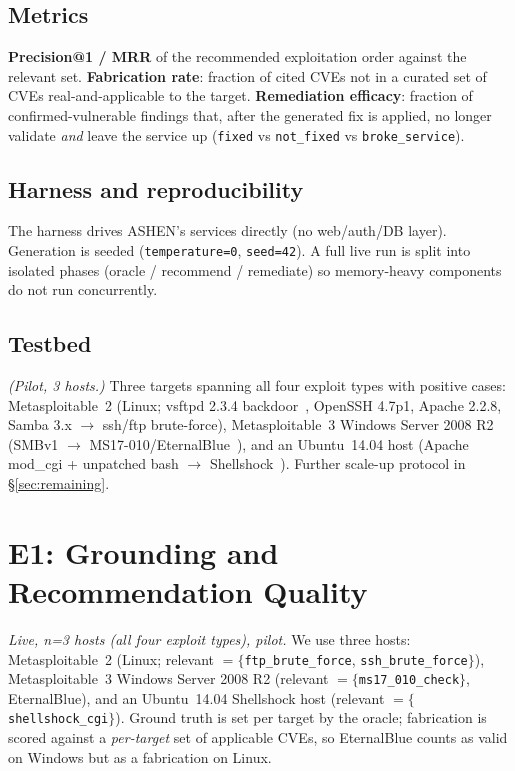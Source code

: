 \documentclass[conference]{IEEEtran}
\newcommand{\code}[1]{\texttt{#1}}
\begin{document}
\subsection{Metrics}
\textbf{Precision@1 / MRR} of the recommended exploitation order against the
relevant set. \textbf{Fabrication rate}: fraction of cited CVEs not in a curated
set of CVEs real-and-applicable to the target. \textbf{Remediation efficacy}:
fraction of confirmed-vulnerable findings that, after the generated fix is
applied, no longer validate \emph{and} leave the service up (\code{fixed} vs
\code{not\_fixed} vs \code{broke\_service}).

\subsection{Harness and reproducibility}
The harness drives ASHEN's services directly (no web/auth/DB layer). Generation
is seeded (\code{temperature=0}, \code{seed=42}). A full live run is split into
isolated phases (oracle / recommend / remediate) so memory-heavy components do not
run concurrently.

\subsection{Testbed}
\emph{(Pilot, 3 hosts.)} Three targets spanning all four exploit types with
positive cases: Metasploitable~2 (Linux; vsftpd 2.3.4 backdoor~\cite{vsftpd},
OpenSSH 4.7p1, Apache 2.2.8, Samba 3.x $\rightarrow$ ssh/ftp brute-force),
Metasploitable~3 Windows Server 2008 R2 (SMBv1 $\rightarrow$
MS17-010/EternalBlue~\cite{ms17010}), and an Ubuntu~14.04 host (Apache mod\_cgi +
unpatched bash $\rightarrow$ Shellshock~\cite{shellshock}). Further scale-up
protocol in \S\ref{sec:remaining}.

\section{E1: Grounding and Recommendation Quality}\label{sec:e1}
\emph{Live, n=3 hosts (all four exploit types), pilot.} We use three hosts:
Metasploitable~2 (Linux; relevant $=\{$\code{ftp\_brute\_force},
\code{ssh\_brute\_force}$\}$), Metasploitable~3 Windows Server 2008 R2
(relevant $=\{$\code{ms17\_010\_check}$\}$, EternalBlue), and an Ubuntu~14.04
Shellshock host (relevant $=\{$\code{shellshock\_cgi}$\}$). Ground truth is set per
target by the oracle; fabrication is scored against a \emph{per-target} set of
applicable CVEs, so EternalBlue counts as valid on Windows but as a fabrication on
Linux.
\end{document}
